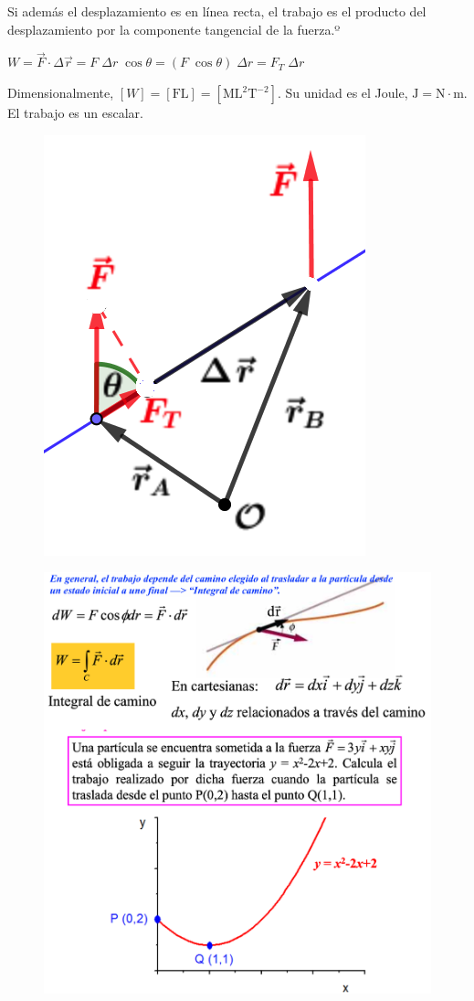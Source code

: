 \begin{multicols}{2}
Si además el desplazamiento es en línea recta, el trabajo es el producto del desplazamiento por la componente tangencial de la fuerza.º

\vspace{3mm} %
$W=\vec F\cdot \Delta \vec r=F\; \Delta r\; 	\cos \theta= (F\; \cos \theta)\; \Delta r= F_T \;\Delta r$

\vspace{3mm} %
Dimensionalmente, $[W]=[\mathrm{FL}]=[\mathrm{ML}^2\mathrm{T}^{-2}]$. Su unidad es el Joule, $\mathrm{J}=\mathrm{N} \cdot \mathrm{m}$. El trabajo es un escalar.
\begin{figure}[H]
		\centering
		\includegraphics[width=.4\textwidth]{imagenes/imagenes03/T03IM03.png}
		\end{figure}	
\end{multicols}





\begin{figure}[H]
		\centering
		\includegraphics[width=.8\textwidth]{imagenes/imagenes03/T03IM04.png}
		\end{figure}

